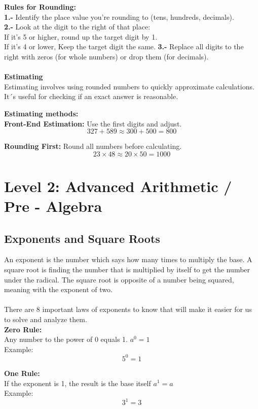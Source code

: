 \documentclass{article} %
\begin{document}
\textbf{Rules for Rounding:}\\
\textbf{1.-} Identify the place value you're rounding to (tens, hundreds, decimals).\\
\textbf{2.-} Look at the digit to the right of that place:\\
If it's 5 or higher, round up the target digit by 1.\\
If it's 4 or lower, Keep the target digit the same.
\textbf{3.-} Replace all digits to the right with zeros (for whole numbers) or drop them (for decimals).\\
\\
\textbf{Estimating}\\
Estimating involves using rounded numbers to quickly approximate calculations. It´s useful for checking if an exact answer is reasonable.

\textbf{Estimating methods:}\\
\textbf{Front-End Estimation:} Use the first digits and adjust.\\
\[
327 + 589 \approx 300 + 500 = 800
\]

\noindent \textbf{Rounding First:} Round all numbers before calculating.\\
\[
23 \times 48 \approx 20 \times 50 = 1000
\]

\section{Level 2: Advanced Arithmetic / Pre - Algebra}

\subsection{Exponents and Square Roots}
An exponent is the number which says how many times to multiply the base. A square root is finding the number that is multiplied by itself to get the number under the radical. The square root is opposite of a number being squared, meaning with the exponent of two.\\
\\
There are 8 important laws of exponents to know that will make it easier for us to solve and analyze them.
\\
\textbf{Zero Rule:}\\
Any number to the power of 0 equals 1. $a^{0} = 1$\\
Example:\\
\[
5^{0} = 1
\]

\noindent\textbf{One Rule:}\\
If the exponent is 1, the result is the base itself $a^{1} = a$\\
Example:\\
\[
3^{1} = 3
\]
\end{document}
